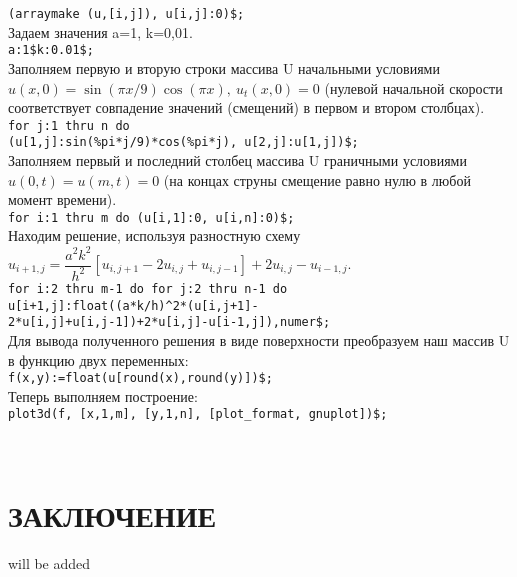 \documentclass[article, bachelor, och, pract]{SCWorks}
\begin{document}
\begin{itemize}
\texttt{(arraymake (u,[i,j]), u[i,j]:0)\$;}\\
Задаем значения a=1, k=0,01.\\
\texttt{a:1\$k:0.01\$;}\\
Заполняем первую и вторую строки массива U начальными условиями \(u(x,0)=\sin(\pi x/9)\cos(\pi x), \ u_{t}(x,0)=0\) (нулевой начальной скорости соответствует совпадение значений (смещений) в первом и втором столбцах).\\
\texttt{for j:1 thru n do}\\
\texttt{(u[1,j]:sin(\%pi*j/9)*cos(\%pi*j), u[2,j]:u[1,j])\$;}\\
Заполняем первый и последний столбец массива U граничными условиями \(u(0,t)=u(m,t)=0\) (на концах струны смещение равно нулю в любой момент времени).\\
\texttt{for i:1 thru m do (u[i,1]:0, u[i,n]:0)\$;}\\
Находим решение, используя разностную схему\\
\(u_{i+1,j}=\dfrac{a^2 k^2}{h^2}[u_{i,j+1}-2u_{i,j}+u_{i,j-1}]+2u_{i,j}-u_{i-1,j}.\)\\
\texttt{for i:2 thru m-1 do for j:2 thru n-1 do}\\
\texttt{u[i+1,j]:float((a*k/h)\^{}2*(u[i,j+1]-}\\
\texttt{2*u[i,j]+u[i,j-1])+2*u[i,j]-u[i-1,j]),numer\$;}\\
Для вывода полученного решения в виде поверхности преобразуем наш массив U в функцию двух переменных:\\
\texttt{f(x,y):=float(u[round(x),round(y)])\$;}\\
Теперь выполняем построение:\\
\texttt{plot3d(f, [x,1,m], [y,1,n], [plot\_format, gnuplot])\$;}
\begin{figure}[h]
\end{figure}\\
\end{itemize}

\section*{ЗАКЛЮЧЕНИЕ}
will be added 
\end{document}
